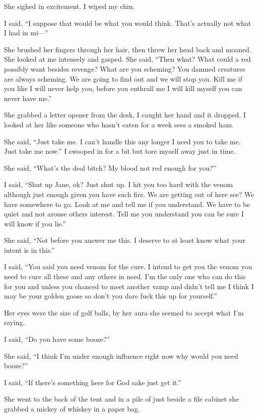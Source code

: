 She sighed in excitement. I wiped my chin.

I said, ``I suppose that would be what you would think. That's actually not what I had in mi---''

She brushed her fingers through her hair, then threw her head back and moaned. She looked at me intensely and gasped. She said, ``Then what? What could a red possibly want besides revenge? What are you scheming? You damned creatures are always scheming. We are going to find out and we will stop you. Kill me if you like I will never help you, before you enthrall me I will kill myself you can never have me.''

She grabbed a letter opener from the desk, I caught her hand and it dropped. I looked at her like someone who hasn't eaten for a week sees a smoked ham.

She said, ``Just take me. I can't handle this any longer I need you to take me. Just take me now.'' I swooped in for a bit but tore myself away just in time.

She said, ``What's the deal bitch? My blood not red enough for you?''

I said, ``Shut up Jane, ok? Just shut up. I hit you too hard with the venom although just enough given you have such fire. We are getting out of here see? We have somewhere to go. Look at me and tell me if you understand. We have to be quiet and not arouse others interest. Tell me you understand you can be sure I will know if you lie.''

She said, ``Not before you answer me this. I deserve to at least know what your intent is in this.''

I said, ``You said you need venom for the cure. I intend to get you the venom you need to cure all these and any others in need. I'm the only one who can do this for you and unless you chanced to meet another vamp and didn't tell me I think I may be your golden goose so don't you dare fuck this up for yourself.''

Her eyes were the size of golf balls, by her aura she seemed to accept what I'm saying.

I said, ``Do you have some booze?''

She said, ``I think I'm under enough influence right now why would you need booze?''

I said, ``If there's something here for God sake just get it.''

She went to the back of the tent and in a pile of just beside a file cabinet she grabbed a mickey of whiskey in a paper bag.

